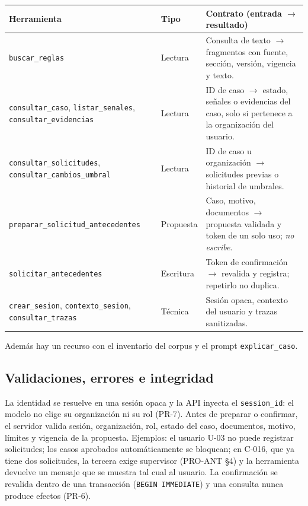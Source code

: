 \documentclass[11pt,a4paper]{article}
\newcommand{\codigo}[1]{\texttt{\small #1}}
\newcommand{\cab}{\rowcolor{azulmira!14}}
\newcommand{\tabla}{\small\rowcolors{2}{white}{grisclaro}}
\begin{document}
\begin{center}\tabla
\begin{tabularx}{\textwidth}{@{}p{4.3cm}p{1.7cm}Y@{}}
\toprule
\cab\textbf{Herramienta} & \textbf{Tipo} & \textbf{Contrato (entrada $\rightarrow$ resultado)}\\
\midrule
\codigo{buscar\_\allowbreak reglas} & Lectura & Consulta de texto $\rightarrow$ fragmentos con fuente, sección, versión, vigencia y texto.\\
\codigo{consultar\_\allowbreak caso}, \codigo{listar\_\allowbreak senales}, \codigo{consultar\_\allowbreak evidencias} & Lectura & ID de caso $\rightarrow$ estado, señales o evidencias del caso, solo si pertenece a la organización del usuario.\\
\codigo{consultar\_\allowbreak solicitudes}, \codigo{consultar\_\allowbreak cambios\_\allowbreak umbral} & Lectura & ID de caso u organización $\rightarrow$ solicitudes previas o historial de umbrales.\\
\codigo{preparar\_\allowbreak solicitud\_\allowbreak antecedentes} & Propuesta & Caso, motivo, documentos $\rightarrow$ propuesta validada y token de un solo uso; \emph{no escribe}.\\
\codigo{solicitar\_\allowbreak antecedentes} & Escritura & Token de confirmación $\rightarrow$ revalida y registra; repetirlo no duplica.\\
\codigo{crear\_\allowbreak sesion}, \codigo{contexto\_\allowbreak sesion}, \codigo{consultar\_\allowbreak trazas} & Técnica & Sesión opaca, contexto del usuario y trazas sanitizadas.\\
\bottomrule
\end{tabularx}
\end{center}
Además hay un recurso con el inventario del corpus y el prompt \codigo{explicar\_\allowbreak caso}.

\subsection{Validaciones, errores e integridad}
La identidad se resuelve en una sesión opaca y la API inyecta el \codigo{session\_\allowbreak id}: el modelo no elige su organización ni su rol (PR-7). Antes de preparar o confirmar, el servidor valida sesión, organización, rol, estado del caso, documentos, motivo, límites y vigencia de la propuesta. Ejemplos: el usuario U-03 no puede registrar solicitudes; los casos aprobados automáticamente se bloquean; en C-016, que ya tiene dos solicitudes, la tercera exige supervisor (PRO-ANT §4) y la herramienta devuelve un mensaje que se muestra tal cual al usuario. La confirmación se revalida dentro de una transacción (\codigo{BEGIN IMMEDIATE}) y una consulta nunca produce efectos (PR-6).
\end{document}
